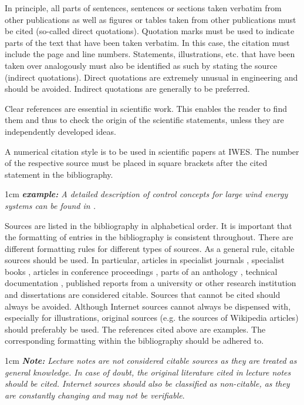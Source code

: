 In principle, all parts of sentences, sentences or sections taken verbatim from other publications as well as figures or tables taken from other publications must be cited (so-called direct quotations). Quotation marks must be used to indicate parts of the text that have been taken verbatim. In this case, the citation must include the page and line numbers. Statements, illustrations, etc. that have been taken over analogously must also be identified as such by stating the source (indirect quotations). Direct quotations are extremely unusual in engineering and should be avoided. Indirect quotations are generally to be preferred.

Clear references are essential in scientific work. This enables the reader to find them and thus to check the origin of the scientific statements, unless they are independently developed ideas.

A numerical citation style is to be used in scientific papers at IWES. The number of the respective source must be placed in square brackets after the cited statement in the bibliography. 

\begin{addmargin}[1cm]{1cm}
	\textit{\textbf{example:} A detailed description of control concepts for large wind energy systems can be found in \cite{buch}.}
\end{addmargin}

Sources are listed in the bibliography in alphabetical order. It is important that the formatting of entries in the bibliography is consistent throughout. There are different formatting rules for different types of sources. As a general rule, citable sources should be used. In particular, articles in specialist journals \cite{artikel}, specialist books \cite{buch}, articles in conference proceedings \cite{inp}, parts of an anthology \cite{in}, technical documentation \cite{manual}, published reports from a university or other research institution \cite{bericht} and dissertations \cite{thesis} are considered citable. Sources that cannot be cited should always be avoided. Although Internet sources \cite{internet} cannot always be dispensed with, especially for illustrations, original sources (e.g. the sources of Wikipedia articles) should preferably be used. The references cited above are examples. The corresponding formatting within the bibliography should be adhered to.


\begin{addmargin}[1cm]{1cm}
	\textit{\textbf{Note:} Lecture notes are not considered citable sources as they are treated as general knowledge. In case of doubt, the original literature cited in lecture notes should be cited. Internet sources should also be classified as non-citable, as they are constantly changing and may not be verifiable}.
\end{addmargin}



